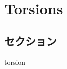 \documentclass[main]{subfiles}
\begin{document}
\chapter{Torsions}

\section{セクション}

torsion
\end{document}

